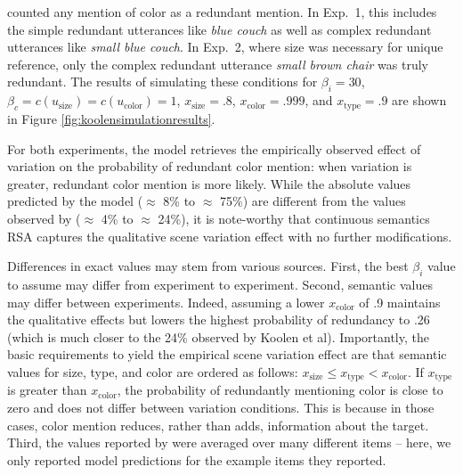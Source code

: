 \documentclass[11pt]{article}
\newcommand{\figref}[1]{Figure \ref{#1}}
\newcommand{\appref}[1]{Appendix \ref{#1}}
\begin{document}
 counted any mention of color as a redundant mention. In Exp.~1, this includes the simple redundant utterances like \emph{blue couch} as well as complex redundant utterances like \emph{small blue couch}. In Exp.~2, where size was necessary for unique reference, only the complex redundant utterance \emph{small brown chair} was truly redundant.  The results of simulating these conditions for $\beta_i = 30$, $ \beta_c = c(u_{\textrm{size}}) = c(u_{\textrm{color}}) = 1$, $x_{\text{size}} = .8$, $x_{\text{color}} = .999$, and $x_{\text{type}} = .9$ are shown in \figref{fig:koolensimulationresults}.%


For both experiments, the model retrieves the empirically observed effect of variation on the probability of redundant color mention: when variation is greater, redundant color mention is more likely. While the absolute values predicted by the model ($\approx$ 8\% to $\approx$ 75\%) are different from the values observed by   ($\approx$ 4\% to $\approx$ 24\%), it is note-worthy that continuous semantics RSA captures the qualitative scene variation effect with no further modifications.  

Differences in exact values may stem from various sources. First, the best $\beta_i$ value to assume may differ from experiment to experiment. Second, semantic values may differ between experiments. Indeed, assuming a lower $x_{\text{color}}$  of .9 maintains the qualitative effects but lowers the highest probability of redundancy to .26 (which is much closer to the 24\% observed by Koolen et al). Importantly, the basic requirements to yield the empirical scene variation effect are that semantic values for size, type, and color are ordered as follows: $x_{\text{size}} \leq  x_{\text{type}} < x_{\text{color}}$. If $x_{\text{type}}$ is greater than $x_{\text{color}}$, the probability of redundantly mentioning color is close to zero and does not differ between variation conditions. This is because in those cases, color mention reduces, rather than adds, information about the target. Third, the values reported by  were averaged over many different items -- here, we only reported model predictions for the example items they reported.
\end{document}
